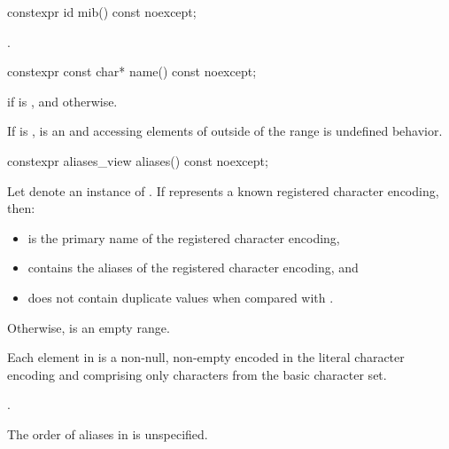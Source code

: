 %
\begin{itemdecl}
constexpr id mib() const noexcept;
\end{itemdecl}

\begin{itemdescr}
\pnum
\returns
{}.
\end{itemdescr}

%
\begin{itemdecl}
constexpr const char* name() const noexcept;
\end{itemdecl}

\begin{itemdescr}
\pnum
\returns
{} if 
is , and
 otherwise.

\pnum
\remarks
If  is ,
 is an \ntbs{} and
accessing elements of 
outside of the range 
is undefined behavior.
\end{itemdescr}

%
\begin{itemdecl}
constexpr aliases_view aliases() const noexcept;
\end{itemdecl}

\begin{itemdescr}
Let  denote an instance of .
If  represents a known registered character encoding, then:
\begin{itemize}
\item
{} is the primary name of the registered character encoding,
\item
{} contains the aliases of the registered character encoding, and
\item
{} does not contain duplicate values when compared with .
\end{itemize}
Otherwise,  is an empty range.

\pnum
Each element in 
is a non-null, non-empty \ntbs{} encoded in the literal character encoding and
comprising only characters from the basic character set.

\pnum
\returns
{}.

\pnum
\begin{note}
The order of aliases in  is unspecified.
\end{note}
\end{itemdescr}

